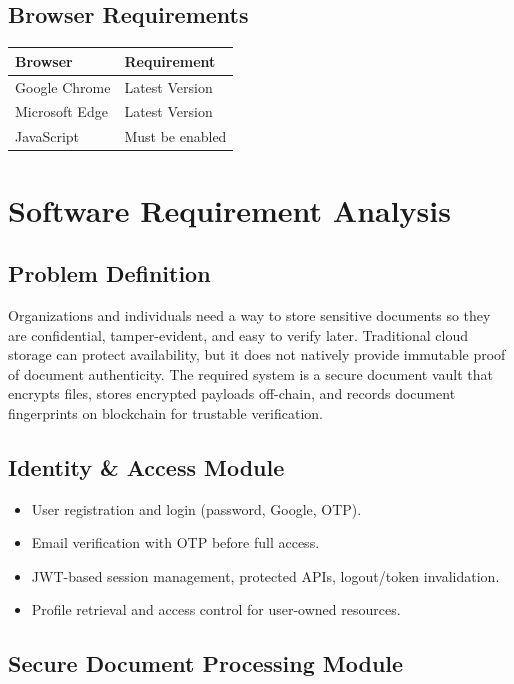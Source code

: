 \documentclass[12pt]{article}
\begin{document}
\subsection{Browser Requirements}

\begin{center}
\begin{tabular}{|l|p{10cm}|}
\hline
\textbf{Browser} & \textbf{Requirement} \\
\hline
Google Chrome & Latest Version \\
\hline
Microsoft Edge & Latest Version \\
\hline
JavaScript & Must be enabled \\
\hline
\end{tabular}
\end{center}

\newpage
\section{Software Requirement Analysis}
\subsection{Problem Definition}

Organizations and individuals need a way to store sensitive documents so they are confidential, tamper-evident, and easy to verify later. Traditional cloud storage can protect availability, but it does not natively provide immutable proof of document authenticity. The required system is a secure document vault that encrypts files, stores encrypted payloads off-chain, and records document fingerprints on blockchain for trustable verification.


\subsection{Identity \& Access Module}

\begin{itemize}
\item User registration and login (password, Google, OTP).
\item Email verification with OTP before full access.
\item JWT-based session management, protected APIs, logout/token invalidation.
\item Profile retrieval and access control for user-owned resources.
\end{itemize}

\subsection{Secure Document Processing Module}
\end{document}
